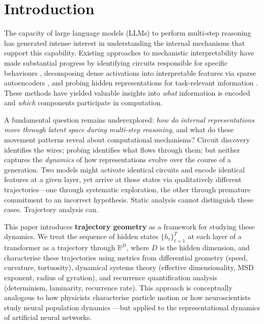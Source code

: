 \documentclass[11pt,twocolumn]{article}
\begin{document}
\begin{abstract}
\textbf{Keywords:} mechanistic interpretability, hidden states, trajectory analysis, chain-of-thought reasoning, computational geometry, transformer dynamics
\end{abstract}

\section{Introduction}
\label{sec:intro}

The capacity of large language models (LLMs) to perform multi-step reasoning has generated intense interest in understanding the internal mechanisms that support this capability. Existing approaches to mechanistic interpretability have made substantial progress by identifying circuits responsible for specific behaviours \citep{conmy2023acdc, wang2022interpretability}, decomposing dense activations into interpretable features via sparse autoencoders \citep{bricken2023monosemanticity, cunningham2023sparse}, and probing hidden representations for task-relevant information \citep{belinkov2022probing}. These methods have yielded valuable insights into \emph{what} information is encoded and \emph{which} components participate in computation.

A fundamental question remains underexplored: \emph{how do internal representations move through latent space during multi-step reasoning}, and what do these movement patterns reveal about computational mechanisms? Circuit discovery identifies the wires; probing identifies what flows through them; but neither captures the \emph{dynamics} of how representations evolve over the course of a generation. Two models might activate identical circuits and encode identical features at a given layer, yet arrive at those states via qualitatively different trajectories---one through systematic exploration, the other through premature commitment to an incorrect hypothesis. Static analysis cannot distinguish these cases. Trajectory analysis can.

This paper introduces \textbf{trajectory geometry} as a framework for studying these dynamics. We treat the sequence of hidden states $\{h_t\}_{t=1}^{T}$ at each layer of a transformer as a trajectory through $\mathbb{R}^D$, where $D$ is the hidden dimension, and characterise these trajectories using metrics from differential geometry (speed, curvature, tortuosity), dynamical systems theory (effective dimensionality, MSD exponent, radius of gyration), and recurrence quantification analysis (determinism, laminarity, recurrence rate). This approach is conceptually analogous to how physicists characterise particle motion or how neuroscientists study neural population dynamics \citep{gallego2017neural, cunningham2014dimensionality}---but applied to the representational dynamics of artificial neural networks.
\end{document}
